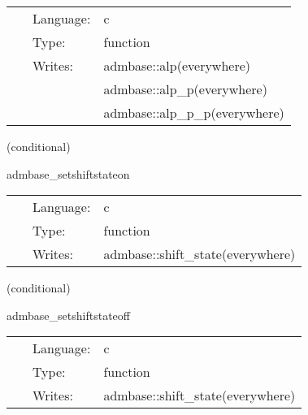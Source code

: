 \documentclass{article}
\begin{document}
\hspace{5mm}{\it set the lapse to 1 at all points } 


\hspace{5mm}

 \begin{tabular*}{160mm}{cll} 
~ & Language:  & c \\ 
~ & Type:  & function \\ 
~ & Writes:  & admbase::alp(everywhere) \\ 
~& ~ &admbase::alp\_p(everywhere)\\ 
~& ~ &admbase::alp\_p\_p(everywhere)\\ 
\end{tabular*} 


\vspace{5mm}

   (conditional) 

\hspace{5mm} admbase\_setshiftstateon 

\hspace{5mm}{\it set the shift\_state variable to 1 } 


\hspace{5mm}

 \begin{tabular*}{160mm}{cll} 
~ & Language:  & c \\ 
~ & Type:  & function \\ 
~ & Writes:  & admbase::shift\_state(everywhere) \\ 
\end{tabular*} 


\vspace{5mm}

   (conditional) 

\hspace{5mm} admbase\_setshiftstateoff 

\hspace{5mm}{\it set the shift\_state variable to 0 } 


\hspace{5mm}

 \begin{tabular*}{160mm}{cll} 
~ & Language:  & c \\ 
~ & Type:  & function \\ 
~ & Writes:  & admbase::shift\_state(everywhere) \\ 
\end{tabular*} 
\end{document}
